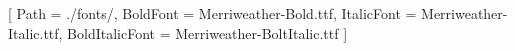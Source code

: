 \usepackage{fontspec}
\usepackage{emoji}
\setmainfont{Merriweather-Regular.ttf}[
    Path = ./fonts/,
    BoldFont = Merriweather-Bold.ttf,
    ItalicFont = Merriweather-Italic.ttf,
    BoldItalicFont = Merriweather-BoltItalic.ttf
]
